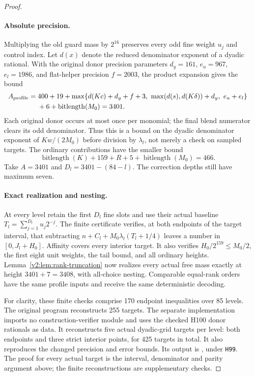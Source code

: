 \documentclass[11pt]{article}
\numberwithin{equation}{section}
\theoremstyle{definition}
\theoremstyle{remark}
\begin{document}
\begin{proof}
\paragraph{Absolute precision.}
Multiplying the old guard mass by $2^{16}$ preserves every odd fine weight $u_j$ and control index. Let $d(x)$ denote the reduced denominator exponent of a dyadic rational. With the original donor precision parameters $d_y=161$, $e_u=967$, $e_l=1986$, and flat-helper precision $f=2003$, the product expansion gives the bound
\begin{align*}
 A_{\rm profile}={}&400+19+
 \max\{d(Kc)+d_y+f+3,\ \max(d(s),d(K\delta))+d_y,\ e_u+e_l\}\\
 &+6+\operatorname{bitlength}(M_0)=3401.
\end{align*}
Each original donor occurs at most once per monomial; the final blend numerator clears its odd denominator. Thus this is a bound on the dyadic denominator exponent of $Kw/(2M_0)$ before division by $\lambda_l$, not merely a check on sampled targets. The ordinary contributions have the smaller bound
\[
 \operatorname{bitlength}(K)+159+R+5+\operatorname{bitlength}(M_0)=466.
\]
Take $A=3401$ and $D_l=3401-(84-l)$. The correction depths still have maximum seven.

\paragraph{Exact realization and nesting.}
At every level retain the first $D_l$ fine slots and use their actual baseline
$T_l=\sum_{j=1}^{D_l}u_j2^{-j}$. The finite certificate verifies, at both endpoints of the target interval, that subtracting $n+C_l+M_0\lambda_l(T_l+1/4)$ leaves a number in $[0,J_l+H_0]$. Affinity covers every interior target. It also verifies $H_0/2^{159}\leq M_0/2$, the first eight unit weights, the tail bound, and all ordinary heights. Lemma~\ref{v2:lem:rank-truncation} now realizes every actual free mass exactly at height $3401+7=3408$, with all-choice nesting. Comparable equal-rank orders have the same profile inputs and receive the same deterministic decoding.

For clarity, these finite checks comprise 170 endpoint inequalities over 85 levels. The original program  reconstructs 255 targets. The separate implementation  imports no construction-verifier module and uses the checked H100 donor rationals as data. It reconstructs five actual dyadic-grid targets per level: both endpoints and three strict interior points, for 425 targets in total. It also reproduces the changed precision and error bounds. Its output is , under \texttt{H99}. The proof for every actual target is the interval, denominator and parity argument above; the finite reconstructions are supplementary checks.


\end{proof}
\end{document}
